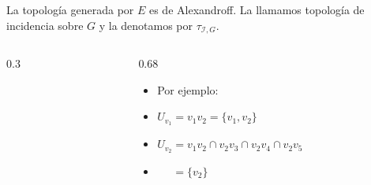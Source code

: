 \begin{frame}[c]
   \vspace*{0.5cm}%
   \begin{prop}
      La topología generada por $E$ es de \alert{Alexandroff}. La llamamos \alert{topología de incidencia} sobre $G$ y la denotamos por $\tau_{\mathcal{I},G}$.\vspace{0.3cm}
   \end{prop}
\end{frame}
\begin{frame}[c]
   \vspace*{1.07cm}%
   \hspace*{0.54cm}%
   \begin{minipage}{\textwidth}
   \begin{columns}[c]
      \begin{column}{0.3\textwidth}
         \centering
         
      \end{column}
      \begin{column}{0.68\textwidth}
         \begin{itemize}
            \item[] Por ejemplo:
            \item $U_{v_1} = v_1v_2 = \{v_1,v_2\}$
            \item<2-> $U_{v_2} = v_1v_2\cap v_2v_3\cap v_2v_4\cap v_2v_5$
            \item<2->[] $\phantom{U_{v_2}} = \{v_2\}$
         \end{itemize}
      \end{column}
   \end{columns}
   \end{minipage}
\end{frame}

